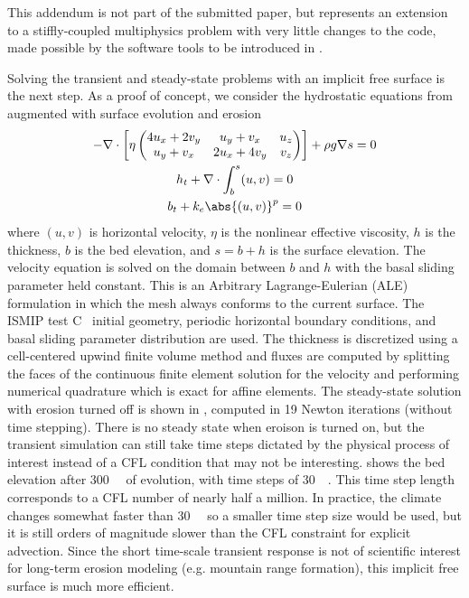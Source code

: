 \textsf{This addendum is not part of the submitted paper, but represents an extension to a stiffly-coupled multiphysics problem with very little changes to the code, made possible by the software tools to be introduced in .}
\vspace{0.5cm}

Solving the transient and steady-state problems with an implicit free surface is the next step.
As a proof of concept, we consider the hydrostatic equations from  augmented with surface evolution and erosion
\begin{gather}
  - \nabla\cdot \left[ \eta
    \begin{pmatrix}
      4 u_x + 2 v_y & u_y + v_x & u_z \\
      u_y + v_x & 2 u_x + 4 v_y & v_z
    \end{pmatrix} \right] + \rho g \nabla s = 0 \\
  h_t + \nabla\cdot \int_b^{s} (u,v) = 0  \\
  b_t + k_e \abs{(u,v)}^p = 0
\end{gather}
where $(u,v)$ is horizontal velocity, $\eta$ is the nonlinear effective viscosity, $h$ is the thickness, $b$ is the bed elevation, and $s = b+h$ is the surface elevation.
The velocity equation is solved on the domain between $b$ and $h$ with the basal sliding parameter held constant.
This is an Arbitrary Lagrange-Eulerian (ALE) formulation \citep{donea2004arbitrary} in which the mesh always conforms to the current surface.
The ISMIP test C~\cite{pattyn2008beh} initial geometry, periodic horizontal boundary conditions, and basal sliding parameter distribution are used.
The thickness is discretized using a cell-centered upwind finite volume method and fluxes are computed by splitting the faces of the continuous finite element solution for the velocity and performing numerical quadrature which is exact for affine elements.
The steady-state solution with erosion turned off is shown in , computed in 19 Newton iterations (without time stepping).
There is no steady state when eroison is turned on, but the transient simulation can still take time steps dictated by the physical process of interest instead of a CFL condition that may not be interesting.
 shows the bed elevation after \SI{300}{\kilo\year} of evolution, with time steps of \SI{30}{\kilo\year}.
This time step length corresponds to a CFL number of nearly half a million.
In practice, the climate changes somewhat faster than \SI{30}{\kilo\year} so a smaller time step size would be used, but it is still orders of magnitude slower than the CFL constraint for explicit advection.
Since the short time-scale transient response is not of scientific interest for long-term erosion modeling (e.g. mountain range formation), this implicit free surface is much more efficient.

